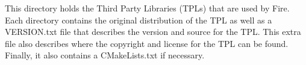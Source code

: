 This directory holds the Third Party Libraries (T\+P\+Ls) that are used by Fire. Each directory contains the original distribution of the T\+P\+L as well as a V\+E\+R\+S\+I\+O\+N.\+txt file that describes the version and source for the T\+P\+L. This extra file also describes where the copyright and license for the T\+P\+L can be found. Finally, it also contains a C\+Make\+Lists.\+txt if necessary. 